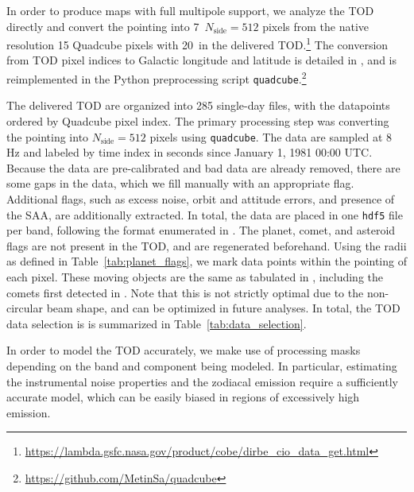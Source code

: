 \documentclass{aa}
\begin{document}
In order to produce maps with full multipole support, we analyze the TOD directly and convert the pointing into 7\arcm\  $N_\mathrm{side}=512$ pixels from the native resolution 15 Quadcube pixels with 20\arcs\ in the delivered TOD.\footnote{\url{https://lambda.gsfc.nasa.gov/product/cobe/dirbe\_cio\_data\_get.html}} The conversion from TOD pixel indices to Galactic longitude and latitude is detailed in \citet{cobe_exsupp}, and is reimplemented in the Python preprocessing script \texttt{quadcube}.\footnote{\url{https://github.com/MetinSa/quadcube}}

The delivered TOD are organized into 285 single-day files, with the datapoints ordered by Quadcube pixel index. The primary processing step was converting the pointing into $N_\mathrm{side}=512$ pixels using \texttt{quadcube}. The data are sampled at 8\,Hz and labeled by time index in seconds since January 1, 1981 00:00 UTC. Because the data are pre-calibrated and bad data are already removed, there are some gaps in the data, which we fill manually with an appropriate flag. Additional flags, such as excess noise, orbit and attitude errors, and presence of the SAA, are additionally extracted. In total, the data are placed in one \texttt{hdf5} file per band, following the format enumerated in \citet{bp03}.
The planet{, comet, and asteroid} flags are not present in the TOD, and are regenerated beforehand. Using the radii as defined in Table~\ref{tab:planet_flags}, we mark data points within the pointing of each pixel. {These moving objects are the same as tabulated in \citet{arendt:2014}, including the comets first detected in \citet{lisse:1998}.} Note that this is not strictly optimal due to the non-circular beam shape, and can be optimized in future analyses. In total, the TOD data selection is is summarized in Table~\ref{tab:data_selection}.






In order to model the TOD accurately, we make use of processing masks depending on the band and component being modeled. In particular, estimating the instrumental noise properties and the zodiacal emission require a sufficiently accurate model, which can be easily biased in regions of excessively high emission.
\end{document}

